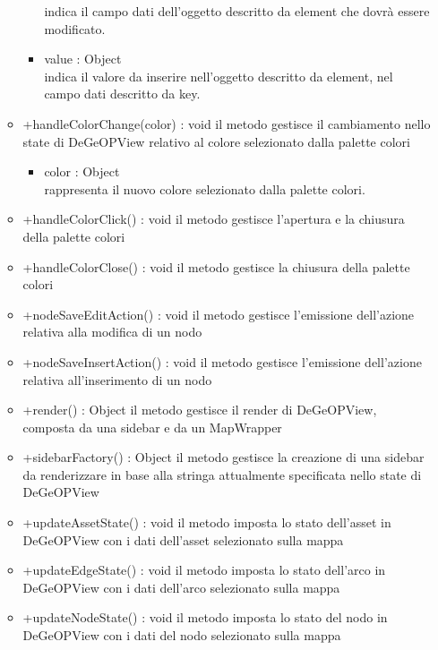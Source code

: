 \begin{itemize}
\begin{itemize}
\begin{itemize}
			indica il campo dati dell'oggetto descritto da element che dovrà essere modificato.
			\item value : Object\\
			indica il valore da inserire nell'oggetto descritto da element, nel campo dati descritto da key.
		\end{itemize}
		\item +handleColorChange(color) : void\newline
		il metodo gestisce il cambiamento nello state di DeGeOPView relativo al colore selezionato dalla palette colori
		\begin{itemize}
			\item color : Object\\
			rappresenta il nuovo colore selezionato dalla palette colori.
		\end{itemize}
		\item +handleColorClick() : void\newline
		il metodo gestisce l'apertura e la chiusura della palette colori
		\item +handleColorClose() : void\newline
		il metodo gestisce la chiusura della palette colori
		\item +nodeSaveEditAction() : void\newline
		il metodo gestisce l'emissione dell'azione relativa alla modifica di un nodo
		\item +nodeSaveInsertAction() : void\newline
		il metodo gestisce l'emissione dell'azione relativa all'inserimento di un nodo
		\item +render() : Object\newline
		il metodo gestisce il render di DeGeOPView, composta da una sidebar e da un MapWrapper
		\item +sidebarFactory() : Object\newline
		il metodo gestisce la creazione di una sidebar da renderizzare in base alla stringa attualmente specificata nello state di DeGeOPView
		\item +updateAssetState() : void\newline
		il metodo imposta lo stato dell'asset in DeGeOPView con i dati dell'asset selezionato sulla mappa
		\item +updateEdgeState() : void\newline
		il metodo imposta lo stato dell'arco in DeGeOPView con i dati dell'arco selezionato sulla mappa
		\item +updateNodeState() : void\newline
		il metodo imposta lo stato del nodo in DeGeOPView con i dati del nodo selezionato sulla mappa
	\end{itemize}
\end{itemize}
\newpage
